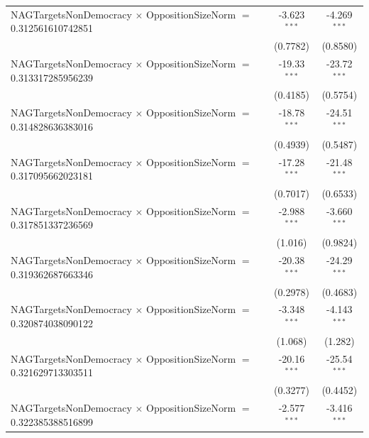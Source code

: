 \begin{tabular}{lcc}
   NAGTargetsNonDemocracy $\times$ OppositionSizeNorm $=$ 0.312561610742851     & -3.623$^{***}$       & -4.269$^{***}$\\   
                                                                                & (0.7782)             & (0.8580)\\   
   NAGTargetsNonDemocracy $\times$ OppositionSizeNorm $=$ 0.313317285956239     & -19.33$^{***}$       & -23.72$^{***}$\\   
                                                                                & (0.4185)             & (0.5754)\\   
   NAGTargetsNonDemocracy $\times$ OppositionSizeNorm $=$ 0.314828636383016     & -18.78$^{***}$       & -24.51$^{***}$\\   
                                                                                & (0.4939)             & (0.5487)\\   
   NAGTargetsNonDemocracy $\times$ OppositionSizeNorm $=$ 0.317095662023181     & -17.28$^{***}$       & -21.48$^{***}$\\   
                                                                                & (0.7017)             & (0.6533)\\   
   NAGTargetsNonDemocracy $\times$ OppositionSizeNorm $=$ 0.317851337236569     & -2.988$^{***}$       & -3.660$^{***}$\\   
                                                                                & (1.016)              & (0.9824)\\   
   NAGTargetsNonDemocracy $\times$ OppositionSizeNorm $=$ 0.319362687663346     & -20.38$^{***}$       & -24.29$^{***}$\\   
                                                                                & (0.2978)             & (0.4683)\\   
   NAGTargetsNonDemocracy $\times$ OppositionSizeNorm $=$ 0.320874038090122     & -3.348$^{***}$       & -4.143$^{***}$\\   
                                                                                & (1.068)              & (1.282)\\   
   NAGTargetsNonDemocracy $\times$ OppositionSizeNorm $=$ 0.321629713303511     & -20.16$^{***}$       & -25.54$^{***}$\\   
                                                                                & (0.3277)             & (0.4452)\\   
   NAGTargetsNonDemocracy $\times$ OppositionSizeNorm $=$ 0.322385388516899     & -2.577$^{***}$       & -3.416$^{***}$\\   

\end{tabular}
